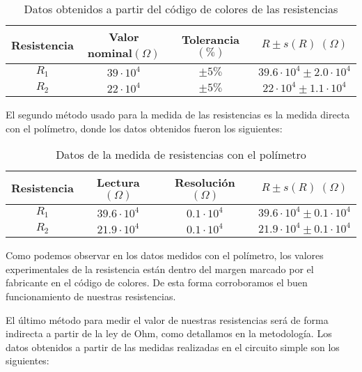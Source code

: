 \documentclass[a4paper,12pt,titlepage]{article}
\begin{document}
\begin{table}[h]
    \centering
    \begin{tabular}{|c|c|c|c|}
    \hline
    Resistencia & Valor nominal$(\Omega)$ &Tolerancia$(\%)$ & $R \pm s(R)\; (\Omega)$ \\ \hline
    $R_{1}$  &   $39\cdot 10^4$ & $\pm 5 \%$ & $39.6\cdot 10^4 \pm 2.0\cdot 10^4$\\ \hline
    $R_{2} $  &  $22 \cdot 10^4$&$\pm 5 \%$& $22 \cdot 10^4 \pm 1.1 \cdot 10^4 $ \\ \hline
    \end{tabular}
    \caption{Datos obtenidos a partir del código de colores de las resistencias}
    \label{R colores}
\end{table}

El segundo método usado para la medida de las resistencias es la medida directa con el polímetro, donde los datos obtenidos fueron los siguientes:

\begin{table}[h!]
    \centering
    \begin{tabular}{|c|c|c|c|}
    \hline
    Resistencia & Lectura$(\Omega)$ & Resolución$(\Omega)$ & $R\pm s(R)\; (\Omega)$  \\ \hline
    $R_{1}$     & $39.6\cdot 10^4$& $0.1\cdot 10^4$& $39.6 \cdot 10^4 \pm 0.1 \cdot 10^4$ \\ \hline
    $R_{2}$ & $21.9\cdot 10^4$ & $0.1\cdot 10^4$ & $21.9 \cdot 10^4 \pm 0.1 \cdot 10^4$ \\ \hline
    \end{tabular}
    \caption{Datos de la medida de resistencias con el polímetro}
    \label{R con polimetro}
\end{table}

Como podemos observar en los datos medidos con el polímetro, los valores experimentales de la resistencia están dentro del margen marcado por el fabricante en el código de colores. De esta forma corroboramos el buen funcionamiento de nuestras resistencias.
\par El último método para medir el valor de nuestras resistencias será de forma indirecta a partir de la ley de Ohm, como detallamos en la metodología. Los datos obtenidos a partir de las medidas realizadas en el circuito simple son los siguientes:
\end{document}
